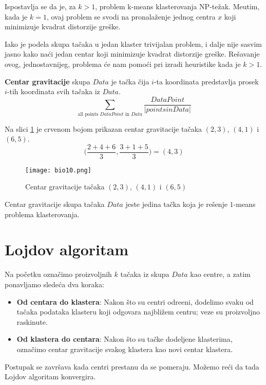 Ispostavlja se da je, za $k>1$, problem k-means klasterovanja NP-težak. Me\dj utim, kada je $k=1$, ovaj problem se svodi na pronalaženje jednog centra $x$ koji minimizuje kvadrat distorzije greške. 

Iako je podela skupa tačaka u jedan klaster trivijalan problem, i dalje nije sasvim jasno kako naći jedan centar koji minimizuje kvadrat distorzije greške. Rešavanje ovog, jednostavnijeg, problema će nam pomoći pri izradi heuristike kada je $k>1$.

\textbf{Centar gravitacije} skupa $Data$ je tačka čija $i$-ta koordinata predstavlja prosek $i$-tih koordinata svih tačaka iz $Data$.
$$\sum_{\text{all points }DataPoint\text{ in }Data}\frac{DataPoint}{|points in Data|}$$

Na slici \ref{slika 9} je crvenom bojom prikazan centar gravitacije tačaka $(2,3)$, $(4,1)$ i $(6,5)$.
$$ \bigg(\frac{2+4+6}{3}, \frac{3+1+5}{3}\bigg) = (4,3)$$
\begin{figure}[h]
    \centering
    \texttt{[image: bio10.png]}
    \caption{Centar gravitacije tačaka $(2,3)$, $(4,1)$ i $(6,5)$}
    \label{slika 9}
\end{figure}

\begin{teorema}{Centar gravitacije skupa tačaka $Data$ jeste jedina tačka koja je rešenje $1$-means problema klasterovanja.}
\end{teorema}

\section{Lojdov algoritam}

Na početku označimo proizvoljnih $k$ tačaka iz skupa $Data$ kao centre, a zatim ponavljamo sledeća dva koraka:

\begin{itemize}
\item \textbf{Od centara do klastera}: Nakon što su centri odre\dj eni, dodelimo svaku od tačaka podataka klasteru koji odgovara najbližem centru; veze su proizvoljno raskinute.

\item \textbf{Od klastera do centara}: Nakon što su tačke dodeljene klasterima, označimo centar gravitacije svakog klastera kao novi centar klastera.
\end{itemize}
 
Postupak se završava kada centri prestanu da se pomeraju. Možemo reći da tada Lojdov algoritam konvergira.
 
